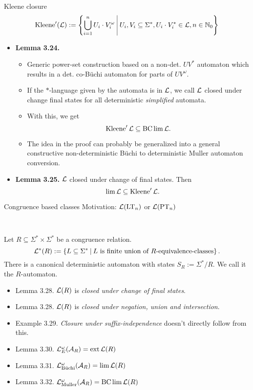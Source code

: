 \documentclass[
	handout,
	notheorems,noamsthm]{beamer}
\begin{document}
\begin{frame}[<+->]{Kleene closure}
\[ \Kleene'(\Lang) := \Set{ \bigcup_{i=1}^n U_i \cdot V_i^\omega}{U_i, V_i \subseteq \Sigma^*, U_i \cdot V_i^* \in \Lang, n \in \N_0} \]

\begin{itemize}
\item \textbf{Lemma 3.24.}
\begin{itemize}
\item Generic power-set construction based on a non-det. $U V^*$ automaton which results in a det. co-Büchi automaton for parts of $U V^\omega$.
\item If the $*$-language given by the automata is in $\mathcal{L}$, we call $\mathcal{L}$ closed under change final states for all deterministic \emph{simplified} automata.
\item With this, we get
\[ \operatorname{Kleene}' \mathcal{L} \subseteq \operatorname{BC} \lim \mathcal{L} . \]
\item The idea in the proof can probably be generalized into a general constructive non-deterministic Büchi to deterministic Muller automaton conversion.
\end{itemize}

\item \textbf{Lemma 3.25.} $\mathcal{L}$ closed under change of final states. Then
\[ \lim \mathcal{L} \subseteq \operatorname{Kleene}' \mathcal{L} . \]
\end{itemize}
\end{frame}

\begin{frame}[<+->]{Congruence based classes}
Motivation: $\mathcal{L}(\textup{\textrm{LT}}_n)$ or $\mathcal{L}(\textup{\textrm{PT}}_n)$

\

Let $R\subseteq\Sigma^* \times \Sigma^*$ be a congruence relation.
\[ \Lang^*(R) := \Set{L \subseteq \Sigma^*}{L \text{ is finite union of $R$-equivalence-classes}} . \]
There is a canonical deterministic automaton with states $S_R := \Sigma^*/R$. We call it the $R$-automaton.

\begin{itemize}
\item Lemma 3.28. $\mathcal{L}(R)$ is \emph{closed under change of final states}.
\item Lemma 3.28. $\mathcal{L}(R)$ is \emph{closed under negation, union and intersection}.
\item Example 3.29. \emph{Closure under suffix-independence} doesn't directly follow from this.
%
\item Lemma 3.30. $\mathcal{L}^\omega_E(\mathcal{A}_R) = \operatorname{ext} \mathcal{L}(R)$
\item Lemma 3.31. $\mathcal{L}^\omega_{\text{Büchi}}(\mathcal{A}_R) = \lim \mathcal{L}(R)$
\item Lemma 3.32. $\mathcal{L}^\omega_{\text{Muller}}(\mathcal{A}_R) = \operatorname{BC} \lim \mathcal{L}(R)$
\end{itemize}
\end{frame}
\end{document}
